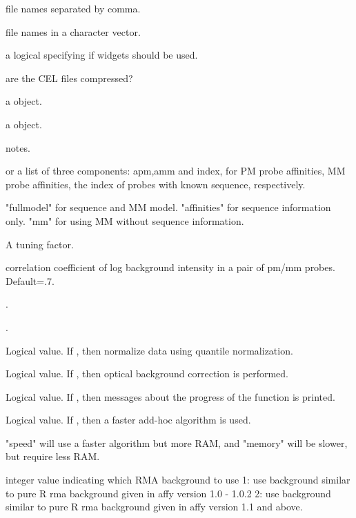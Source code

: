 \begin{Arguments}
\begin{ldescription}
\item[\code{...}] file names separated by comma.
\item[\code{filenames}] file names in a character vector.
\item[\code{widget}] a logical specifying if widgets should be used.
\item[\code{compress}] are the CEL files compressed?
\item[\code{phenoData}] a  object.
\item[\code{description}] a  object.
\item[\code{notes}] notes.
\item[\code{affinity.info}]  or a list of three components:
apm,amm and index, for PM probe affinities, MM probe affinities,
the index of probes with known sequence, respectively.
\item[\code{type}] "fullmodel" for sequence and MM model. "affinities" for
sequence information only. "mm" for using MM without sequence
information.
\item[\code{k}] A tuning factor.
\item[\code{rho}] correlation coefficient of log background intensity in a pair of pm/mm probes.
Default=.7.
\item[\code{stretch}] .
\item[\code{correction}] .
\item[\code{normalize}] Logical value. If , then normalize data using
quantile normalization.
\item[\code{optical.correct}] Logical value. If , then optical
background correction is performed.
\item[\code{verbose}] Logical value. If , then messages about the progress of
the function is printed.
\item[\code{fast}] Logical value. If , then a faster add-hoc algorithm is used.
\item[\code{optimize.by}] "speed" will use a faster algorithm but more RAM, and "memory"
will be slower, but require less RAM.
\item[\code{bgversion}] integer value indicating which RMA background to use 1: use
background similar to pure R rma background given in affy
version 1.0 - 1.0.2 2: use background similar to pure R rma
background given in affy version 1.1 and above.

\end{ldescription}
\end{Arguments}
